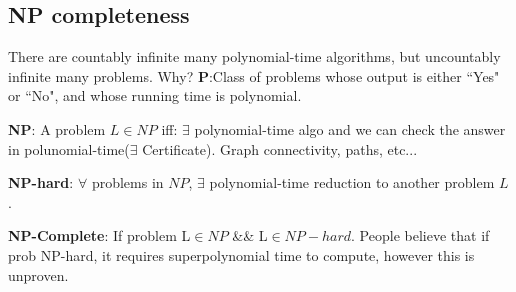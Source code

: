 \documentclass[landscape,4pt,a4paper]{article}
\begin{document}
\begin{multicols*}{5}
		\section{NP completeness}
				There are countably infinite many polynomial-time algorithms, but uncountably infinite many  problems. Why?
				\textbf{P}:Class of problems whose output is either ``Yes" or ``No", and whose running time is polynomial. 

				\textbf{NP}: A problem $L\in NP$ iff: $\exists$ polynomial-time algo and we can check the answer in 
				polunomial-time($\exists$ Certificate). Graph connectivity, paths, etc...

				\textbf{NP-hard}: $\forall$ problems in $NP$, $\exists$ polynomial-time reduction to another problem $L$. 

				\textbf{NP-Complete}: If problem L$\in NP$ \&\& L$\in NP-hard$. People believe that if prob NP-hard, 
				it requires superpolynomial time to compute, however this is unproven.
	\end{multicols*}
\end{document}
